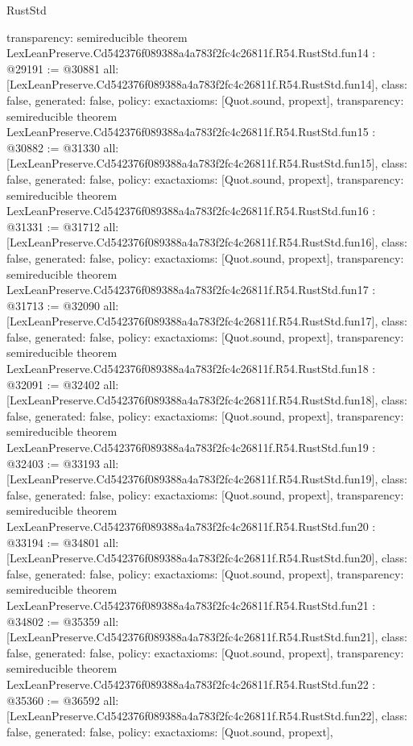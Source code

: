 \begin{lexlean}{RustStd}
\begin{coremodule}
{  transparency: semireducible
}
theorem LexLeanPreserve.Cd542376f089388a4a783f2fc4c26811f.R54.RustStd.fun14 : @29191 := @30881 {
  all: [LexLeanPreserve.Cd542376f089388a4a783f2fc4c26811f.R54.RustStd.fun14],
  class: false,
  generated: false,
  policy: exact{axioms: [Quot.sound, propext]},
  transparency: semireducible
}
theorem LexLeanPreserve.Cd542376f089388a4a783f2fc4c26811f.R54.RustStd.fun15 : @30882 := @31330 {
  all: [LexLeanPreserve.Cd542376f089388a4a783f2fc4c26811f.R54.RustStd.fun15],
  class: false,
  generated: false,
  policy: exact{axioms: [Quot.sound, propext]},
  transparency: semireducible
}
theorem LexLeanPreserve.Cd542376f089388a4a783f2fc4c26811f.R54.RustStd.fun16 : @31331 := @31712 {
  all: [LexLeanPreserve.Cd542376f089388a4a783f2fc4c26811f.R54.RustStd.fun16],
  class: false,
  generated: false,
  policy: exact{axioms: [Quot.sound, propext]},
  transparency: semireducible
}
theorem LexLeanPreserve.Cd542376f089388a4a783f2fc4c26811f.R54.RustStd.fun17 : @31713 := @32090 {
  all: [LexLeanPreserve.Cd542376f089388a4a783f2fc4c26811f.R54.RustStd.fun17],
  class: false,
  generated: false,
  policy: exact{axioms: [Quot.sound, propext]},
  transparency: semireducible
}
theorem LexLeanPreserve.Cd542376f089388a4a783f2fc4c26811f.R54.RustStd.fun18 : @32091 := @32402 {
  all: [LexLeanPreserve.Cd542376f089388a4a783f2fc4c26811f.R54.RustStd.fun18],
  class: false,
  generated: false,
  policy: exact{axioms: [Quot.sound, propext]},
  transparency: semireducible
}
theorem LexLeanPreserve.Cd542376f089388a4a783f2fc4c26811f.R54.RustStd.fun19 : @32403 := @33193 {
  all: [LexLeanPreserve.Cd542376f089388a4a783f2fc4c26811f.R54.RustStd.fun19],
  class: false,
  generated: false,
  policy: exact{axioms: [Quot.sound, propext]},
  transparency: semireducible
}
theorem LexLeanPreserve.Cd542376f089388a4a783f2fc4c26811f.R54.RustStd.fun20 : @33194 := @34801 {
  all: [LexLeanPreserve.Cd542376f089388a4a783f2fc4c26811f.R54.RustStd.fun20],
  class: false,
  generated: false,
  policy: exact{axioms: [Quot.sound, propext]},
  transparency: semireducible
}
theorem LexLeanPreserve.Cd542376f089388a4a783f2fc4c26811f.R54.RustStd.fun21 : @34802 := @35359 {
  all: [LexLeanPreserve.Cd542376f089388a4a783f2fc4c26811f.R54.RustStd.fun21],
  class: false,
  generated: false,
  policy: exact{axioms: [Quot.sound, propext]},
  transparency: semireducible
}
theorem LexLeanPreserve.Cd542376f089388a4a783f2fc4c26811f.R54.RustStd.fun22 : @35360 := @36592 {
  all: [LexLeanPreserve.Cd542376f089388a4a783f2fc4c26811f.R54.RustStd.fun22],
  class: false,
  generated: false,
  policy: exact{axioms: [Quot.sound, propext]},
}
\end{coremodule}
\end{lexlean}
